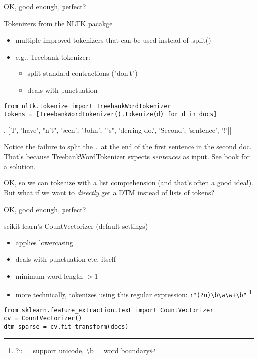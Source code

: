 \documentclass[compress]{beamer}
\begin{document}
\begin{frame}[fragile]{OK, good enough, perfect?}
	\begin{block}{Tokenizers from the NLTK pacakge}
		\begin{itemize}
			\item multiple improved tokenizers that can be used instead of .split()
			\item e.g., Treebank tokenizer:
			\begin{itemize}
				\item split standard contractions ("don't")
				\item deals with punctuation
			\end{itemize}			
		\end{itemize}
	\end{block}
\begin{lstlisting}
from nltk.tokenize import TreebankWordTokenizer
tokens = [TreebankWordTokenizer().tokenize(d) for d in docs]
\end{lstlisting}
\begin{lstlistingoutputtiny}
[['This', 'is', 'a', 'text'],  ['I', 'have', "n't", 'seen', 'John', "'s", 'derring-do.', 'Second', 'sentence', '!']]
\end{lstlistingoutputtiny}
\tiny{Notice the failure to split the \texttt{.} at the end of the first sentence in the second doc. That's because TreebankWordTokenizer expects \emph{sentences} as input. See book for a solution.\\}
\end{frame}


\begin{frame}[standout]
OK, so we can tokenize with a list comprehension (and that's often a good idea!). But what if we want to \emph{directly} get a DTM instead of lists of tokens?
\end{frame}


\begin{frame}[fragile]{OK, good enough, perfect?}
	\begin{block}{scikit-learn's CountVectorizer (default settings)}
		\begin{itemize}
			\item applies lowercasing
			\item deals with punctuation etc. itself
			\item minimum word length $>1$
			\item more technically, tokenizes using this regular expression: \texttt{r"(?u)\textbackslash b\textbackslash w\textbackslash w+\textbackslash b"} \footnote{?u = support unicode, \textbackslash b = word boundary}
		\end{itemize}
	\end{block}
\begin{lstlisting}
from sklearn.feature_extraction.text import CountVectorizer
cv = CountVectorizer()
dtm_sparse = cv.fit_transform(docs)
\end{lstlisting}
\end{frame}
\end{document}
